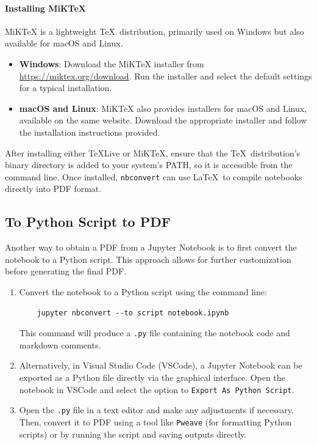 \documentclass{article}
\begin{document}
\paragraph{Installing MiKTeX}
MiKTeX is a lightweight \TeX~distribution, primarily used on Windows but also available for macOS and Linux.

\begin{itemize}
    \item \textbf{Windows}: Download the MiKTeX installer from \url{https://miktex.org/download}. Run the installer and select the default settings for a typical installation.
    
    \item \textbf{macOS and Linux}: MiKTeX also provides installers for macOS and Linux, available on the same website. Download the appropriate installer and follow the installation instructions provided.
\end{itemize}

After installing either TeXLive or MiKTeX, ensure that the \TeX~distribution’s binary directory is added to your system’s PATH, so it is accessible from the command line. Once installed, \texttt{nbconvert} can use \LaTeX~to compile notebooks directly into PDF format.





\subsection{To Python Script to PDF}

Another way to obtain a PDF from a Jupyter Notebook is to first convert the notebook to a Python script. This approach allows for further customization before generating the final PDF.

\begin{enumerate}
    \item Convert the notebook to a Python script using the command line:
    \begin{verbatim}
    jupyter nbconvert --to script notebook.ipynb
    \end{verbatim}
    This command will produce a \texttt{.py} file containing the notebook code and markdown comments.
    
    \item Alternatively, in Visual Studio Code (VSCode), a Jupyter Notebook can be exported as a Python file directly via the graphical interface. Open the notebook in VSCode and select the option to \texttt{Export As Python Script}. 

    \item Open the \texttt{.py} file in a text editor and make any adjustments if necessary. Then, convert it to PDF using a tool like \texttt{Pweave} (for formatting Python scripts) or by running the script and saving outputs directly.
\end{enumerate}
\end{document}
